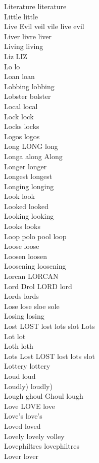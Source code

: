 Literature literature\\
Little little\\
Live Evil veil vile live evil\\
Liver livre liver\\
Living living\\
Liz LIZ\\
Lo lo\\
Loan loan\\
Lobbing lobbing\\
Lobster bolster\\
Local local\\
Lock lock\\
Locks locks\\
Logos logos\\
Long LONG long\\
Longa along Along\\
Longer longer\\
Longest longest\\
Longing longing\\
Look look\\
Looked looked\\
Looking looking\\
Looks looks\\
Loop polo pool loop\\
Loose loose\\
Loosen loosen\\
Loosening loosening\\
Lorcan LORCAN\\
Lord Drol LORD lord\\
Lords lords\\
Lose lose sloe sole\\
Losing losing\\
Lost LOST lost lots slot Lots\\
Lot lot\\
Loth loth\\
Lots Lost LOST lost lots slot\\
Lottery lottery\\
Loud loud\\
Loudly) loudly)\\
Lough ghoul Ghoul lough\\
Love LOVE love\\
Love's love's\\
Loved loved\\
Lovely lovely volley\\
Lovephiltres lovephiltres\\
Lover lover\\
